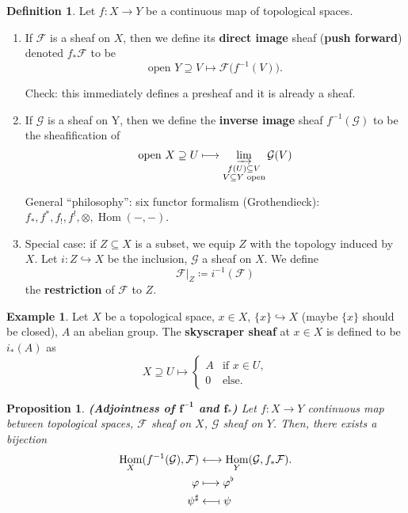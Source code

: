 \documentclass[12pt]{article}
\DeclareMathOperator{\Hom}{Hom}
\newtheorem*{proposition}{Proposition}
\theoremstyle{definition}
\newtheorem*{definition}{Definition}
\newtheorem*{example}{Example}
\begin{document}
\begin{definition}
Let $f:X\rightarrow Y$ be a continuous map of topological spaces.

\begin{enumerate}[label=\arabic*)]
\item If $\mathcal{F}$ is a sheaf on $X$, then we define its \textbf{direct image} sheaf (\textbf{push forward}) denoted $f_*\mathcal{F}$ to be
\[\text{open }Y\supseteq V\longmapsto\mathcal{F}\big(f^{-1}(V)\big).\]

Check: this immediately defines a presheaf and it is already a sheaf.

\item If $\mathcal{G}$ is a sheaf on Y, then we define the \textbf{inverse image} sheaf $f^{-1}(\mathcal{G})$ to be the sheafification of
\[\text{open }X\supseteq U\longmapsto\varinjlim_{\substack{f(U)\subseteq V\\V\subseteq Y\text{ open}}}\mathcal{G}(V)\]

General ``philosophy'': six functor formalism (Grothendieck): $f_*,f^*,f_!,f^!,\otimes,\Hom(-,-)$.

\item Special case: if $Z\subseteq X$ is a subset, we equip $Z$ with the topology induced by $X$. Let $i:Z\hookrightarrow X$ be the inclusion, $\mathcal{G}$ a sheaf on $X$. We define
\[\mathcal{F}|_Z\coloneqq i^{-1}(\mathcal{F})\]
the \textbf{restriction} of $\mathcal{F}$ to $Z$.
\end{enumerate}
\end{definition}

\begin{example}
Let $X$ be a topological space, $x\in X$, $\{x\}\hookrightarrow X$ (maybe $\{x\}$ should be closed), $A$ an abelian group. The \textbf{skyscraper sheaf} at $x\in X$ is defined to be $i_*(A)$ as
\[X\supseteq U\longmapsto\left\{\begin{array}{ll}A&\text{if }x\in U,\\0&\text{else}.\end{array}\right.\]
\end{example}

\begin{proposition}
\emph{\textbf{(Adjointness of $\boldsymbol{f^{-1}}$ and $\boldsymbol{f_*}$)}} Let $f:X\rightarrow Y$ continuous map between topological spaces, $\mathcal{F}$ sheaf on $X$, $\mathcal{G}$ sheaf on $Y$. Then, there exists a bijection
\begin{align*}
\Hom_X(f^{-1}(\mathcal{G}),\mathcal{F})&\longleftrightarrow\Hom_Y(\mathcal{G},f_*\mathcal{F}).\\
\varphi&\longmapsto\varphi^{\flat}\\
\psi^{\sharp}&\longleftarrow\!\shortmid\psi
\end{align*}
\end{proposition}
\end{document}
